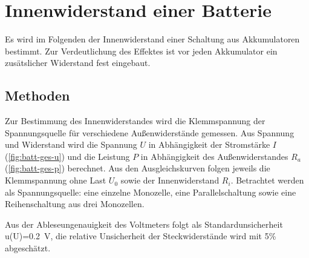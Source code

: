 



\section{Innenwiderstand einer Batterie}

Es wird im Folgenden der Innenwiderstand einer Schaltung aus Akkumulatoren bestimmt. Zur Verdeutlichung des Effektes ist vor jeden Akkumulator ein zusätslicher Widerstand fest eingebaut. 

\subsection{Methoden}


Zur Bestimmung des Innenwiderstandes wird die Klemmspannung der Spannungsquelle für verschiedene Außenwiderstände gemessen. Aus Spannung und Widerstand wird die Spannung $U$ in Abhängigkeit der Stromstärke $I$ (\cref{fig:batt-ges-u}) und die Leistung $P$ in Abhängigkeit des Außenwiderstandes $R_a$ (\cref{fig:batt-ges-p}) berechnet. Aus den Ausgleichskurven folgen jeweils die Klemmspannung ohne Last $U_0$ sowie der Innenwiderstand $R_i$. Betrachtet werden als Spannungsquelle: eine einzelne Monozelle, eine Parallelschaltung sowie eine Reihenschaltung aus drei Monozellen. 

Aus der Ableseungenauigkeit des Voltmeters folgt als Standardunsicherheit u(U)=\SI{0.2}{V}, die relative Unsicherheit der Steckwiderstände wird mit 5\% abgeschätzt.





